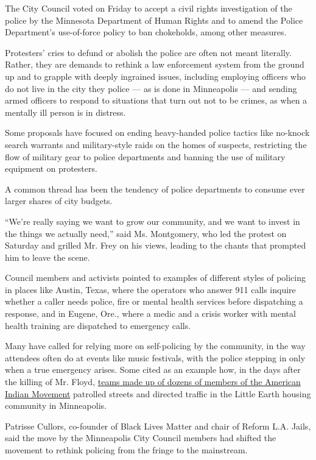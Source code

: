 The City Council voted on Friday to accept a civil rights investigation
of the police by the Minnesota Department of Human Rights and to amend
the Police Department's use-of-force policy to ban chokeholds, among
other measures.

Protesters' cries to defund or abolish the police are often not meant
literally. Rather, they are demands to rethink a law enforcement system
from the ground up and to grapple with deeply ingrained issues,
including employing officers who do not live in the city they police ---
as is done in Minneapolis --- and sending armed officers to respond to
situations that turn out not to be crimes, as when a mentally ill person
is in distress.

Some proposals have focused on ending heavy-handed police tactics like
no-knock search warrants and military-style raids on the homes of
suspects, restricting the flow of military gear to police departments
and banning the use of military equipment on protesters.

A common thread has been the tendency of police departments to consume
ever larger shares of city budgets.

``We're really saying we want to grow our community, and we want to
invest in the things we actually need,'' said Ms. Montgomery, who led
the protest on Saturday and grilled Mr. Frey on his views, leading to
the chants that prompted him to leave the scene.

Council members and activists pointed to examples of different styles of
policing in places like Austin, Texas, where the operators who answer
911 calls inquire whether a caller needs police, fire or mental health
services before dispatching a response, and in Eugene, Ore., where a
medic and a crisis worker with mental health training are dispatched to
emergency calls.

Many have called for relying more on self-policing by the community, in
the way attendees often do at events like music festivals, with the
police stepping in only when a true emergency arises. Some cited as an
example how, in the days after the killing of Mr. Floyd,
\href{https://www.startribune.com/minneapolis-residents-step-up-to-protect-their-neighborhoods-from-little-earth-to-longfellow/570910552/}{teams
made up of dozens of members of the American Indian Movement} patrolled
streets and directed traffic in the Little Earth housing community in
Minneapolis.

Patrisse Cullors, co-founder of Black Lives Matter and chair of Reform
L.A. Jails, said the move by the Minneapolis City Council members had
shifted the movement to rethink policing from the fringe to the
mainstream.

